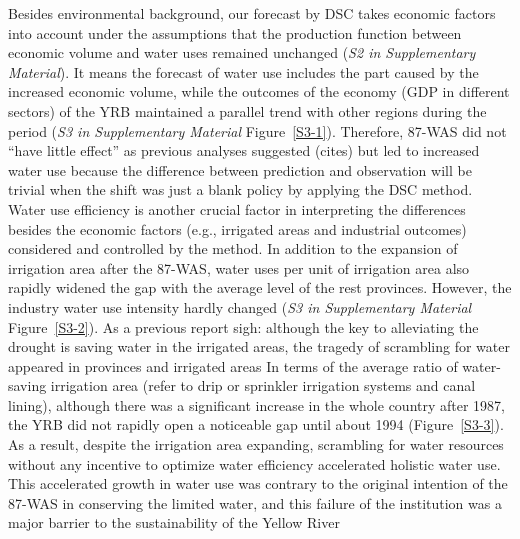 \label{result-1-p2}
Besides environmental background, our forecast by DSC takes economic factors into account under the assumptions that the production function between economic volume and water uses remained unchanged (\textit{S2 in Supplementary Material}).
It means the forecast of water use includes the part caused by the increased economic volume, while the outcomes of the economy (GDP in different sectors) of the YRB maintained a parallel trend with other regions during the period (\textit{S3 in Supplementary Material} Figure~\ref{S3-1}).
Therefore, 87-WAS did not ``have little effect'' as previous analyses suggested (cites) but led to increased water use because the difference between prediction and observation will be trivial when the shift was just a blank policy by applying the DSC method. %
Water use efficiency is another crucial factor in interpreting the differences besides the economic factors (e.g., irrigated areas and industrial outcomes) considered and controlled by the method.
In addition to the expansion of irrigation area after the 87-WAS, water uses per unit of irrigation area also rapidly widened the gap with the average level of the rest provinces. However, the industry water use intensity hardly changed (\textit{S3 in Supplementary Material} Figure~\ref{S3-2}).
As a previous report sigh: although the key to alleviating the drought is saving water in the irrigated areas, the tragedy of scrambling for water appeared in provinces and irrigated areas %
In terms of the average ratio of water-saving irrigation area (refer to drip or sprinkler irrigation systems and canal lining), although there was a significant increase in the whole country after 1987, the YRB did not rapidly open a noticeable gap until about 1994 (Figure~\ref{S3-3}).
As a result, despite the irrigation area expanding, scrambling for water resources without any incentive to optimize water efficiency accelerated holistic water use.
This accelerated growth in water use was contrary to the original intention of the 87-WAS in conserving the limited water, and this failure of the institution was a major barrier to the sustainability of the Yellow River %

